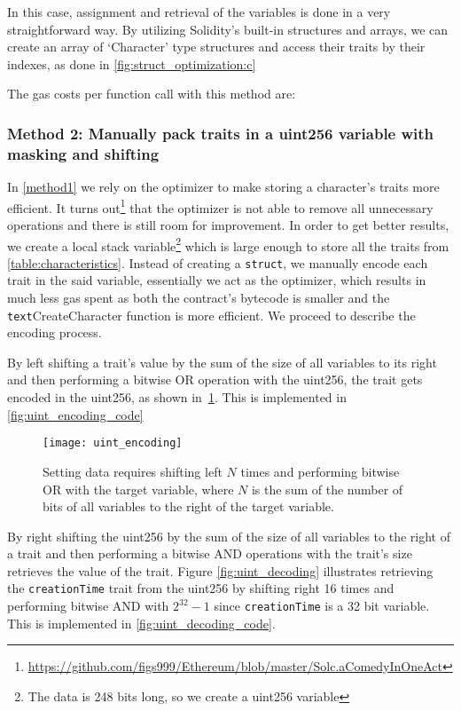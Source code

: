 In this case, assignment and retrieval of the variables is done in a very straightforward way. By utilizing Solidity's built-in structures and arrays, we can create an array of `Character' type structures and access their traits by their indexes, as done in \ref{fig:struct_optimization:c}

The gas costs per function call with this method are: 


\subsubsection{Method 2: Manually pack traits in a uint256 variable with masking and shifting} \label{method2}
    
In \ref{method1} we rely on the optimizer to make storing a character's traits more efficient. It turns out\footnote{\url{https://github.com/figs999/Ethereum/blob/master/Solc.aComedyInOneAct}} that the optimizer is not able to remove all unnecessary operations and there is still room for improvement. In order to get better results, we create a local stack variable\footnote{The data is 248 bits long, so we create a uint256 variable} which is large enough to store all the traits from \ref{table:characteristics}. Instead of creating a \texttt{struct}, we manually encode each trait in the said variable, essentially we act as the optimizer, which results in much less gas spent as both the contract's bytecode is smaller and the \texttt{text}{CreateCharacter} function is more efficient. We proceed to describe the encoding process.

By left shifting a trait's value by the sum of the size of all variables to its right and then performing a bitwise OR operation with the uint256, the trait gets encoded in the uint256, as shown in~\ref{fig:uint_encoding}. This is implemented in \ref{fig:uint_encoding_code}

\begin{figure}[H]
    \centering
    \texttt{[image: uint\_encoding]}
    \caption{Setting data requires shifting left $N$ times and performing bitwise OR with the target variable, where $N$ is the sum of the number of bits of all variables to the right of the target variable.}
    \label{fig:uint_encoding}
\end{figure}

By right shifting the uint256 by the sum of the size of all variables to the right of a trait and then performing a bitwise AND operations with the trait's size retrieves the value of the trait. Figure \ref{fig:uint_decoding} illustrates retrieving the \texttt{creationTime} trait from the uint256 by shifting right 16 times and performing bitwise AND with $2^32-1$ since \texttt{creationTime} is a 32 bit variable. This is implemented in \ref{fig:uint_decoding_code}.

